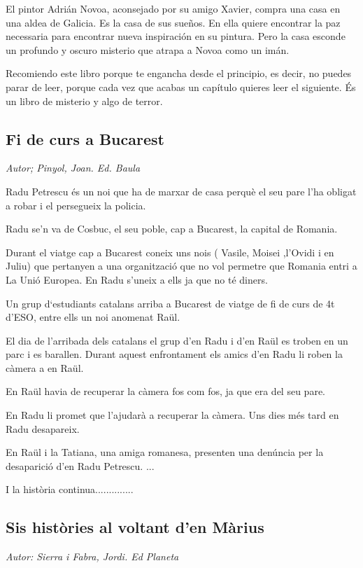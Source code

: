\begin{news}
El pintor Adrián Novoa, aconsejado por su amigo Xavier, compra una casa en una aldea de Galicia. Es la casa de sus sueños. En ella quiere encontrar la paz necessaria para encontrar nueva inspiración en su pintura. Pero la casa esconde un profundo y oscuro misterio que atrapa a Novoa como un imán.

Recomiendo este libro porque te engancha desde el principio, es decir, no puedes parar de leer, porque cada vez que acabas un capítulo quieres leer el siguiente. És un libro de misterio y algo de terror.




\subsection*{Fi de curs a Bucarest}
\emph{Autor; Pinyol, Joan. Ed. Baula}

Radu Petrescu és un noi que ha de marxar de casa perquè el seu pare l’ha obligat a robar i el persegueix la policia.

Radu se’n va de Cosbuc, el seu poble, cap a Bucarest, la capital de Romania.

Durant el viatge cap a Bucarest coneix  uns nois ( Vasile, Moisei ,l'Ovidi i en Juliu) que pertanyen a una organització que no vol permetre que Romania entri a La Unió Europea. En Radu s’uneix a ells ja que no té diners.

Un grup  d‘estudiants catalans arriba a Bucarest de viatge de fi de curs de 4t   d’ESO, entre ells un noi anomenat Raül. 

El dia de l’arribada dels catalans el grup d’en Radu i d’en Raül es troben en  un parc  i es barallen. Durant aquest enfrontament els amics d’en Radu li roben la càmera a en Raül.

En Raül havia de recuperar la càmera fos com fos, ja que era del seu pare.  

En Radu li promet que  l’ajudarà a recuperar la càmera. Uns dies més tard en Radu desapareix.

En Raül i la Tatiana, una amiga romanesa, presenten una denúncia per la desaparició d’en Radu Petrescu. ...

 I la història continua..............


\subsection*{Sis històries al voltant d’en Màrius}
\emph{Autor: Sierra i Fabra, Jordi. Ed Planeta	}


\end{news}

